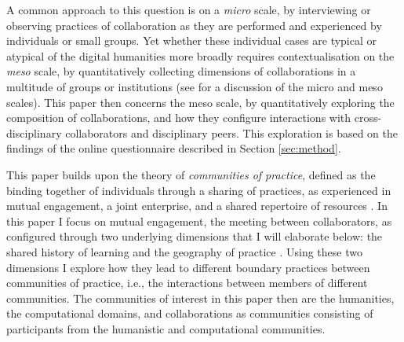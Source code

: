 \documentclass{article}
\begin{document}

A common approach to this question is on a \textit{micro} scale, by interviewing or observing practices of collaboration as they are performed and experienced by individuals or small groups.
Yet whether these individual cases are typical or atypical of the digital humanities more broadly requires contextualisation on the \textit{meso} scale, by quantitatively collecting dimensions of collaborations in a multitude of groups or institutions (see \citealp{edwards2002} for a discussion of the micro and meso scales).
This paper then concerns the meso scale, by quantitatively exploring the composition of collaborations, and how they configure interactions with cross-disciplinary collaborators and disciplinary peers.
This exploration is based on the findings of the online questionnaire described in Section \ref{sec:method}.

This paper builds upon the theory of \textit{communities of practice}, %
defined as the binding together of individuals through a sharing of practices, as experienced in mutual engagement, a joint enterprise, and a shared repertoire of resources \citep[p. 73]{wenger1998}.
In this paper I focus on mutual engagement, the meeting between collaborators, as configured
through two underlying dimensions that I will elaborate below:
the shared history of learning %
and the geography of practice \citep{wenger1998}. %
Using these two dimensions I explore how they lead to different boundary practices between communities of practice, i.e., the interactions between members of different communities.
The communities of interest in this paper then are the humanities, the computational domains, and collaborations as communities consisting of participants from the humanistic and computational communities.
\end{document}

